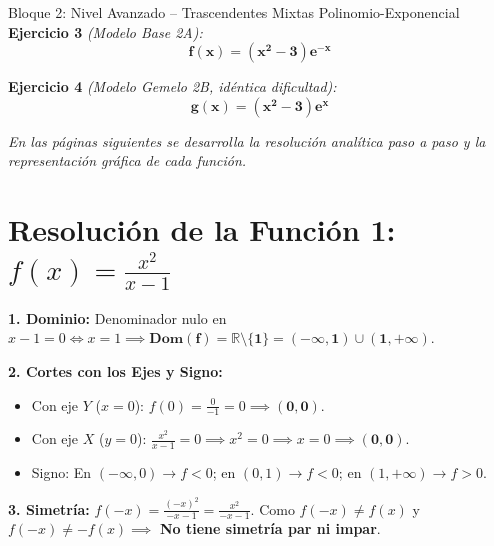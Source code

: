 \documentclass[10pt,a4paper]{article}
\begin{document}
\vspace{5mm}

\begin{ejerciciobox}{Bloque 2: Nivel Avanzado -- Trascendentes Mixtas Polinomio-Exponencial}
\vspace{2mm}
\noindent \textbf{Ejercicio 3} \textit{(Modelo Base 2A):}
$$\mathbf{f(x) = (x^2 - 3) e^{-x}}$$

\vspace{2mm}
\noindent \textbf{Ejercicio 4} \textit{(Modelo Gemelo 2B, idéntica dificultad):}
$$\mathbf{g(x) = (x^2 - 3) e^{x}}$$
\end{ejerciciobox}

\vspace{6mm}
\begin{center}
\small \textit{En las páginas siguientes se desarrolla la resolución analítica paso a paso y la representación gráfica de cada función.}
\end{center}

\newpage

\section*{Resolución de la Función 1: $f(x) = \frac{x^2}{x - 1}$}

\textbf{1. Dominio:}
Denominador nulo en $x - 1 = 0 \iff x = 1 \implies \mathbf{\text{Dom}(f) = \mathbb{R} \setminus \{1\} = (-\infty, 1) \cup (1, +\infty)}$.

\textbf{2. Cortes con los Ejes y Signo:}
\begin{itemize}\itemsep 0pt
    \item Con eje $Y$ ($x = 0$): $f(0) = \frac{0}{-1} = 0 \implies \mathbf{(0, 0)}$.
    \item Con eje $X$ ($y = 0$): $\frac{x^2}{x-1} = 0 \implies x^2 = 0 \implies x = 0 \implies \mathbf{(0, 0)}$.
    \item Signo: En $(-\infty, 0) \to f < 0$; en $(0, 1) \to f < 0$; en $(1, +\infty) \to f > 0$.
\end{itemize}

\textbf{3. Simetría:}
$f(-x) = \frac{(-x)^2}{-x - 1} = \frac{x^2}{-x - 1}$. Como $f(-x) \neq f(x)$ y $f(-x) \neq -f(x) \implies$ \textbf{No tiene simetría par ni impar}.
\end{document}
